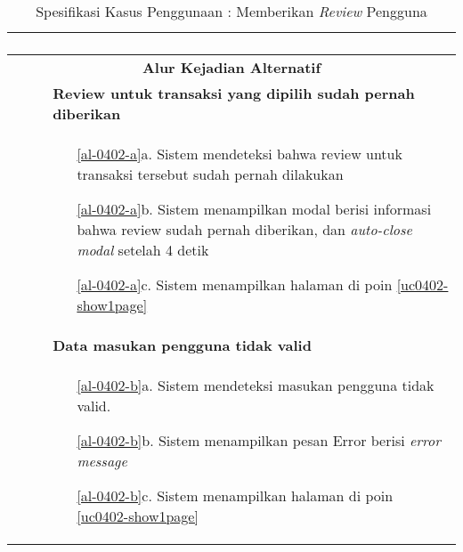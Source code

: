 \begin{table}[H]
\begin{tabular}{|r|p{8cm}|}
\begin{enumerate}
			\end{enumerate}
			\\ \hline
			\multicolumn{2}{|c|}{\textbf{Alur Kejadian Alternatif}} \\ \hline
			\multicolumn{1}{|l|}{}                                   \pagebreak        
			& \textbf{Review untuk transaksi yang dipilih sudah pernah diberikan}
			\\ \hline
			\multicolumn{1}{|l|}{}& 
			\begin{itemize}
				\item[\ref{al-0402-a}a.] Sistem mendeteksi bahwa review untuk transaksi tersebut sudah pernah dilakukan
				\item[\ref{al-0402-a}b.] Sistem menampilkan modal berisi informasi bahwa review sudah pernah diberikan, dan \textit{auto-close modal} setelah 4 detik
				\item[\ref{al-0402-a}c.] Sistem menampilkan halaman di poin \ref{uc0402-show1page}
			\end{itemize}
			\\ \hline
			
			\multicolumn{1}{|l|}{}      
			& \textbf{Data masukan pengguna tidak valid}
			\\ \hline
			\multicolumn{1}{|l|}{}& 
			\begin{itemize}
				\item[\ref{al-0402-b}a.] Sistem mendeteksi masukan pengguna tidak valid.
				\item[\ref{al-0402-b}b.] Sistem menampilkan pesan Error berisi \textit{error message}
				\item[\ref{al-0402-b}c.] Sistem menampilkan halaman di poin \ref{uc0402-show1page}
			\end{itemize}
			\\ \hline
		\end{tabular}
		\caption{Spesifikasi Kasus Penggunaan : Memberikan \textit{Review} Pengguna}
		\label{uc04.02}
	\end{table}
